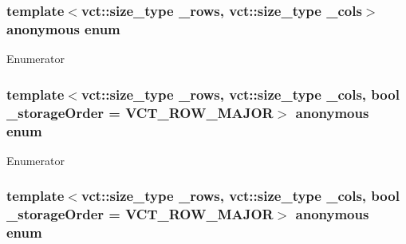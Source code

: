 \hypertarget{group__cisst_numerical_gac1ad1eb1038eeaee33e2783a8d2dbc42}{}\subsubsection[{anonymous enum}]{\setlength{\rightskip}{0pt plus 5cm}template$<$vct\+::size\+\_\+type \+\_\+rows, vct\+::size\+\_\+type \+\_\+cols$>$ anonymous enum}\label{group__cisst_numerical_gac1ad1eb1038eeaee33e2783a8d2dbc42}
\begin{Desc}
\item[Enumerator]\par
\begin{description}
\item[{\em 
\hypertarget{group__cisst_numerical_ggac1ad1eb1038eeaee33e2783a8d2dbc42aa5d1ce549243ebe74888a9a9ede21944}{}M\+I\+N\+\_\+\+M\+N\label{group__cisst_numerical_ggac1ad1eb1038eeaee33e2783a8d2dbc42aa5d1ce549243ebe74888a9a9ede21944}
}]\end{description}
\end{Desc}
\hypertarget{group__cisst_numerical_ga83431081008097567f769607c11d1e20}{}\subsubsection[{anonymous enum}]{\setlength{\rightskip}{0pt plus 5cm}template$<$vct\+::size\+\_\+type \+\_\+rows, vct\+::size\+\_\+type \+\_\+cols, bool \+\_\+storage\+Order = V\+C\+T\+\_\+\+R\+O\+W\+\_\+\+M\+A\+J\+O\+R$>$ anonymous enum}\label{group__cisst_numerical_ga83431081008097567f769607c11d1e20}
\begin{Desc}
\item[Enumerator]\par
\begin{description}
\item[{\em 
\hypertarget{group__cisst_numerical_gga83431081008097567f769607c11d1e20ac4be81b1cc6f6d12232a22300cc4c180}{}M\label{group__cisst_numerical_gga83431081008097567f769607c11d1e20ac4be81b1cc6f6d12232a22300cc4c180}
}]\end{description}
\end{Desc}
\hypertarget{group__cisst_numerical_gafde2fde1248ef26d1678126978dff95e}{}\subsubsection[{anonymous enum}]{\setlength{\rightskip}{0pt plus 5cm}template$<$vct\+::size\+\_\+type \+\_\+rows, vct\+::size\+\_\+type \+\_\+cols, bool \+\_\+storage\+Order = V\+C\+T\+\_\+\+R\+O\+W\+\_\+\+M\+A\+J\+O\+R$>$ anonymous enum}\label{group__cisst_numerical_gafde2fde1248ef26d1678126978dff95e}
